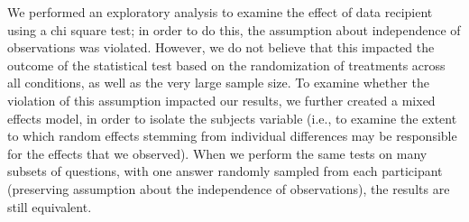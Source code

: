 \documentclass{acm_proc_article-sp}
\begin{document}
						


We performed an exploratory analysis to examine the effect of data recipient using a chi square test; in order to do this, the assumption about independence of observations was violated. However, we do not believe that this impacted the outcome of the statistical test based on the randomization of treatments across all conditions, as well as the very large sample size. To examine whether the violation of this assumption impacted our results, we further created a mixed effects model, in order to isolate the subjects variable (i.e., to examine the extent to which random effects stemming from individual differences may be responsible for the effects that we observed). When we perform the same tests on many subsets of questions, with one answer randomly sampled from each participant (preserving assumption about the independence of observations), the results are still equivalent. 
\end{document}
